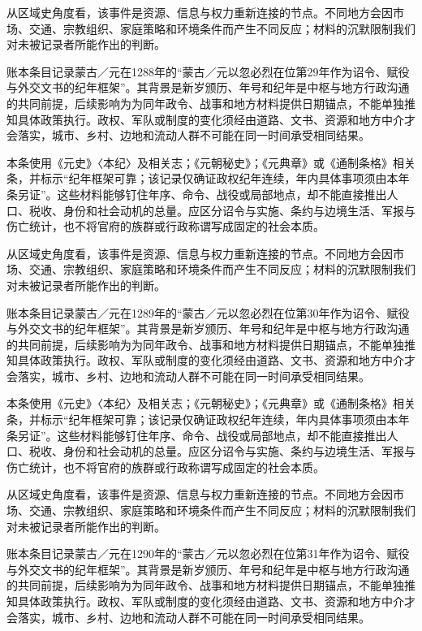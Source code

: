 从区域史角度看，该事件是资源、信息与权力重新连接的节点。不同地方会因市场、交通、宗教组织、家庭策略和环境条件而产生不同反应；材料的沉默限制我们对未被记录者所能作出的判断。

账本条目记录蒙古／元在1288年的“蒙古／元以忽必烈在位第29年作为诏令、赋役与外交文书的纪年框架”。其背景是新岁颁历、年号和纪年是中枢与地方行政沟通的共同前提，后续影响为为同年政令、战事和地方材料提供日期锚点，不能单独推知具体政策执行。政权、军队或制度的变化须经由道路、文书、资源和地方中介才会落实，城市、乡村、边地和流动人群不可能在同一时间承受相同结果。

本条使用《元史》〈本纪〉及相关志；《元朝秘史》；《元典章》或《通制条格》相关条，并标示“纪年框架可靠；该记录仅确证政权纪年连续，年内具体事项须由本年条另证”。这些材料能够钉住年序、命令、战役或局部地点，却不能直接推出人口、税收、身份和社会动机的总量。应区分诏令与实施、条约与边境生活、军报与伤亡统计，也不将官府的族群或行政称谓写成固定的社会本质。

从区域史角度看，该事件是资源、信息与权力重新连接的节点。不同地方会因市场、交通、宗教组织、家庭策略和环境条件而产生不同反应；材料的沉默限制我们对未被记录者所能作出的判断。

账本条目记录蒙古／元在1289年的“蒙古／元以忽必烈在位第30年作为诏令、赋役与外交文书的纪年框架”。其背景是新岁颁历、年号和纪年是中枢与地方行政沟通的共同前提，后续影响为为同年政令、战事和地方材料提供日期锚点，不能单独推知具体政策执行。政权、军队或制度的变化须经由道路、文书、资源和地方中介才会落实，城市、乡村、边地和流动人群不可能在同一时间承受相同结果。

本条使用《元史》〈本纪〉及相关志；《元朝秘史》；《元典章》或《通制条格》相关条，并标示“纪年框架可靠；该记录仅确证政权纪年连续，年内具体事项须由本年条另证”。这些材料能够钉住年序、命令、战役或局部地点，却不能直接推出人口、税收、身份和社会动机的总量。应区分诏令与实施、条约与边境生活、军报与伤亡统计，也不将官府的族群或行政称谓写成固定的社会本质。

从区域史角度看，该事件是资源、信息与权力重新连接的节点。不同地方会因市场、交通、宗教组织、家庭策略和环境条件而产生不同反应；材料的沉默限制我们对未被记录者所能作出的判断。

账本条目记录蒙古／元在1290年的“蒙古／元以忽必烈在位第31年作为诏令、赋役与外交文书的纪年框架”。其背景是新岁颁历、年号和纪年是中枢与地方行政沟通的共同前提，后续影响为为同年政令、战事和地方材料提供日期锚点，不能单独推知具体政策执行。政权、军队或制度的变化须经由道路、文书、资源和地方中介才会落实，城市、乡村、边地和流动人群不可能在同一时间承受相同结果。

